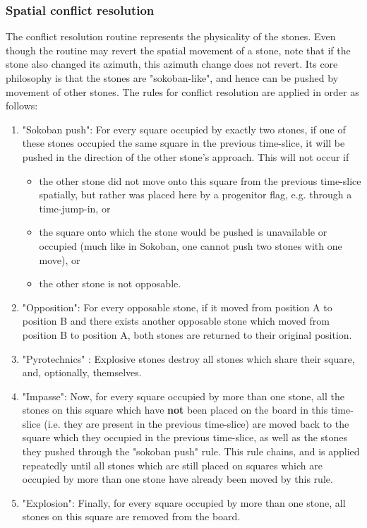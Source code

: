 \documentclass[12pt]{article}
\begin{document}
	\subsubsection{Spatial conflict resolution}\label{sec:spatial conflict resolution}
	The conflict resolution routine represents the physicality of the stones. Even though the routine may revert the spatial movement of a stone, note that if the stone also changed its azimuth, this azimuth change does not revert. Its core philosophy is that the stones are "sokoban-like", and hence can be pushed by movement of other stones. The rules for conflict resolution are applied in order as follows:
	\begin{enumerate}
		\item "Sokoban push": For every square occupied by exactly two stones, if one of these stones occupied the same square in the previous time-slice, it will be pushed in the direction of the other stone's approach. This will not occur if
		\begin{itemize}
			\item the other stone did not move onto this square from the previous time-slice spatially, but rather was placed here by a progenitor flag, e.g. through a time-jump-in, or
			\item the square onto which the stone would be pushed is unavailable or occupied (much like in Sokoban, one cannot push two stones with one move), or
			\item the other stone is not opposable.
		\end{itemize}
		\item "Opposition": For every opposable stone, if it moved from position A to position B and there exists another opposable stone which moved from position B to position A, both stones are returned to their original position.
		\item "Pyrotechnics" : Explosive stones destroy all stones which share their square, and, optionally, themselves.
		\item "Impasse": Now, for every square occupied by more than one stone, all the stones on this square which have \textbf{not} been placed on the board in this time-slice (i.e. they are present in the previous time-slice) are moved back to the square which they occupied in the previous time-slice, as well as the stones they pushed through the "sokoban push" rule. This rule chains, and is applied repeatedly until all stones which are still placed on squares which are occupied by more than one stone have already been moved by this rule.
		\item "Explosion": Finally, for every square occupied by more than one stone, all stones on this square are removed from the board.
	\end{enumerate}
\end{document}
